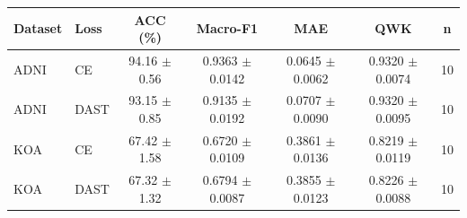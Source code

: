 \begin{tabular}{llccccc}
\toprule
Dataset & Loss & ACC (\%) & Macro-F1 & MAE & QWK & n \\
\midrule
ADNI & CE & 94.16 $\pm$ 0.56 & 0.9363 $\pm$ 0.0142 & 0.0645 $\pm$ 0.0062 & 0.9320 $\pm$ 0.0074 & 10 \\
ADNI & DAST & 93.15 $\pm$ 0.85 & 0.9135 $\pm$ 0.0192 & 0.0707 $\pm$ 0.0090 & 0.9320 $\pm$ 0.0095 & 10 \\
KOA & CE & 67.42 $\pm$ 1.58 & 0.6720 $\pm$ 0.0109 & 0.3861 $\pm$ 0.0136 & 0.8219 $\pm$ 0.0119 & 10 \\
KOA & DAST & 67.32 $\pm$ 1.32 & 0.6794 $\pm$ 0.0087 & 0.3855 $\pm$ 0.0123 & 0.8226 $\pm$ 0.0088 & 10 \\
\bottomrule
\end{tabular}
